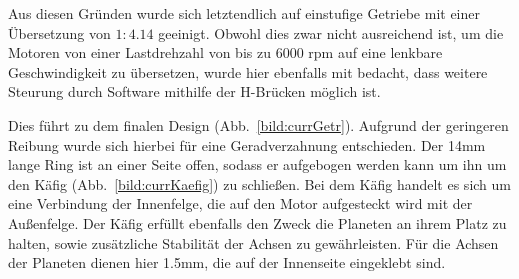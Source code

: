 Aus diesen Gründen wurde sich letztendlich auf einstufige Getriebe mit einer Übersetzung von $1:4.14$ geeinigt.
Obwohl dies zwar nicht ausreichend ist, um die Motoren von einer Lastdrehzahl von bis zu 6000 rpm auf eine lenkbare Geschwindigkeit zu übersetzen,
wurde hier ebenfalls mit bedacht, dass weitere Steurung durch Software mithilfe der H-Brücken möglich ist.

Dies führt zu dem finalen Design (Abb.~\ref{bild:currGetr}). 
Aufgrund der geringeren Reibung wurde sich hierbei für eine Geradverzahnung entschieden.
Der 14mm lange Ring ist an einer Seite offen, sodass er aufgebogen werden kann um ihn um den Käfig (Abb.~\ref{bild:currKaefig}) zu schließen.
Bei dem Käfig handelt es sich um eine Verbindung der Innenfelge, die auf den Motor aufgesteckt wird mit der Außenfelge.
Der Käfig erfüllt ebenfalls den Zweck die Planeten an ihrem Platz zu halten, sowie zusätzliche Stabilität der Achsen zu gewährleisten.
Für die Achsen der Planeten dienen hier 1.5mm, die auf der Innenseite eingeklebt sind.

